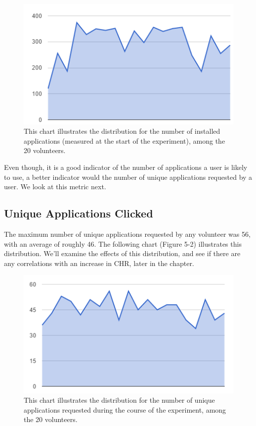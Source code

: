 \documentclass[12pt]{uthesis-v12}  %
\begin{document}
				\begin{figure}[h]
					\centering
					\includegraphics[width = 130mm]{images/totalApps.png}
					\caption[Distribution of Total Installed Applications]{This chart illustrates the distribution for the number of installed applications (measured at the start of the experiment), among the 20 volunteers.}
				\end{figure}
				
				Even though, it is a good indicator of the number of applications a user is likely to use, a better indicator would the number of unique applications requested by a user. We look at this metric next.
				
			\subsection{Unique Applications Clicked}
				The maximum number of unique applications requested by any volunteer was 56, with an average of roughly 46. The following chart (Figure 5-2) illustrates this distribution. We'll examine the effects of this distribution, and see if there are any correlations with an increase in CHR, later in the chapter.
				
				\begin{figure}[h]
					\centering
					\includegraphics[width = 130mm]{images/uniqueApps.png}
					\caption[Distribution of Unique Applications Requested]{This chart illustrates the distribution for the number of unique applications requested during the course of the experiment, among the 20 volunteers.}
				\end{figure}
				
\end{document}
